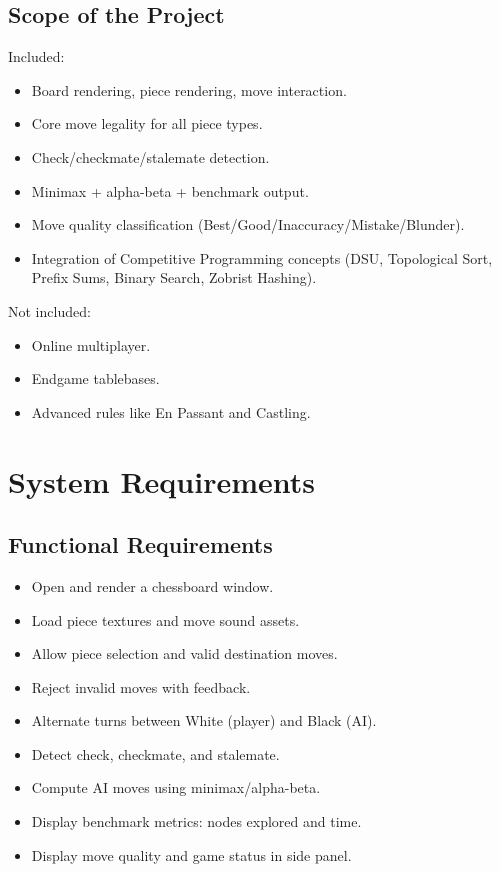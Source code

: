 \documentclass[12pt,a4paper]{article}
\begin{document}
\subsection{Scope of the Project}
Included:
\begin{itemize}
    \item Board rendering, piece rendering, move interaction.
    \item Core move legality for all piece types.
    \item Check/checkmate/stalemate detection.
    \item Minimax + alpha-beta + benchmark output.
    \item Move quality classification (Best/Good/Inaccuracy/Mistake/Blunder).
    \item Integration of Competitive Programming concepts (DSU, Topological Sort, Prefix Sums, Binary Search, Zobrist Hashing).
\end{itemize}

Not included:
\begin{itemize}
    \item Online multiplayer.
    \item Endgame tablebases.
    \item Advanced rules like En Passant and Castling.
\end{itemize}

\section{System Requirements}
\subsection{Functional Requirements}
\begin{itemize}
    \item Open and render a chessboard window.
    \item Load piece textures and move sound assets.
    \item Allow piece selection and valid destination moves.
    \item Reject invalid moves with feedback.
    \item Alternate turns between White (player) and Black (AI).
    \item Detect check, checkmate, and stalemate.
    \item Compute AI moves using minimax/alpha-beta.
    \item Display benchmark metrics: nodes explored and time.
    \item Display move quality and game status in side panel.
\end{itemize}
\end{document}
